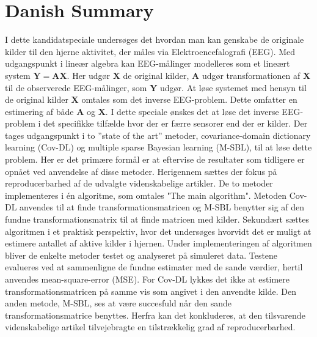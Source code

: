 \chapter*{Danish Summary}
I dette kandidatspeciale undersøges det hvordan man kan genskabe de originale kilder til den hjerne aktivitet, der måles via Elektroencefalografi (EEG). Med udgangspunkt i lineær algebra kan EEG-målinger modelleres som et lineært system $\mathbf{Y}=\mathbf{AX}$. 
Her udgør $\mathbf{X}$ de original kilder, $\mathbf{A}$ udgør transformationen af $\mathbf{X}$ til de observerede EEG-målinger, som $\mathbf{Y}$ udgør.   
At løse systemet med hensyn til de original kilder $\mathbf{X}$ omtales som det inverse EEG-problem. 
Dette omfatter en estimering af både $\mathbf{A}$ og $\mathbf{X}$.
I dette speciale ønskes det at løse det inverse EEG-problem i det specifikke tilfælde hvor der er færre sensorer end der er kilder.  
Der tages udgangspunkt i to ”state of the art” metoder, covariance-domain dictionary learning (Cov-DL) og multiple sparse Bayesian learning (M-SBL), til at løse dette problem. 
Her er det primære formål er at eftervise de resultater som tidligere er opnået ved anvendelse af disse metoder. Herigennem sættes der fokus på reproducerbarhed af de udvalgte videnskabelige artikler.  
De to metoder implementeres i én algoritme, som omtales "The main algorithm". 
Metoden Cov-DL anvendes til at finde transformationsmatricen og M-SBL benytter sig af den fundne transformationsmatrix til at finde matricen med kilder. 
Sekundært sættes algoritmen i et praktisk perspektiv, hvor det undersøges hvorvidt det er muligt at estimere antallet af aktive kilder i hjernen.
Under implementeringen af algoritmen bliver de enkelte metoder testet og analyseret på simuleret data. 
Testene evalueres ved at sammenligne de fundne estimater med de sande værdier, hertil anvendes mean-square-error (MSE). 
For Cov-DL lykkes det ikke at estimere transformationsmatricen på samme vis som angivet i den anvendte kilde.
Den anden metode, M-SBL, ses at være succesfuld når den sande transformationsmatrice benyttes. 
Herfra kan det konkluderes, at den tilsvarende videnskabelige artikel tilvejebragte en tilstrækkelig grad af reproducerbarhed.

